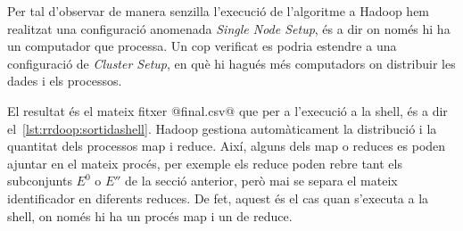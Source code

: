 Per tal d'observar de manera senzilla l'execució de l'algoritme a
Hadoop hem realitzat una configuració anomenada \emph{Single Node
  Setup}, és a dir on només hi ha un computador que processa.  Un cop
verificat es podria estendre a una configuració de \emph{Cluster
  Setup}, en què hi hagués més computadors on distribuir les dades i
els processos.


El resultat és el mateix fitxer @final.csv@ que per a l'execució a la
shell, és a dir el~\autoref{lst:rrdoop:sortidashell}.  Hadoop gestiona
automàticament la distribució i la quantitat dels processos map i
reduce. Així, alguns dels map o reduces es poden ajuntar en el mateix
procés, per exemple els reduce poden rebre tant els subconjunts $E^0$
o $E''$ de la secció anterior, però mai se separa el mateix
identificador en diferents reduces. De fet, aquest és el cas quan
s'executa a la shell, on només hi ha un procés map i un de reduce.


































